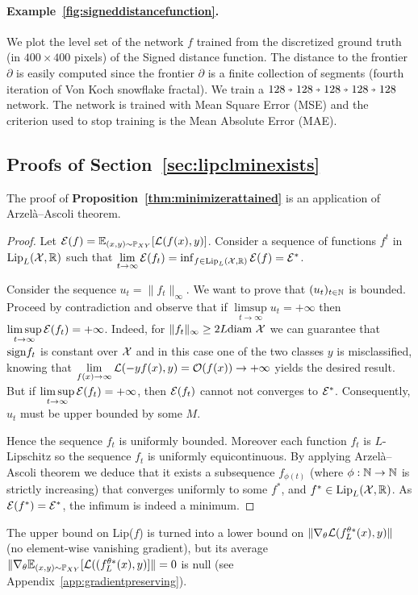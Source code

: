         \paragraph{Example~\ref{fig:signeddistancefunction}.} We plot the level set of the network $f$ trained from the discretized ground truth (in $400\times 400$ pixels) of the Signed distance function. The distance to the frontier $\partial$ is easily computed since the frontier $\partial$ is a finite collection of segments (fourth iteration of Von Koch snowflake fractal). We train a $128\veryshortarrow 128\veryshortarrow 128\veryshortarrow 128\veryshortarrow 128$ \LipCl network. The network is trained with Mean Square Error (MSE) and the criterion used to stop training is the Mean Absolute Error (MAE).   
    
    \subsection{Proofs of Section~\ref{sec:lipclminexists}}
    
    \minimizerattained*
    
        The proof of \textbf{Proposition~\ref{thm:minimizerattained}} is an application of Arzelà–Ascoli theorem.\begin{proof}
        Let $\mathcal{E}(f)=\mathbb{E}_{(x,y)\sim\mathbb{P}_{XY}}[\mathcal{L}(f(x),y)]$. Consider a sequence of functions $f^t$ in $\text{Lip}_L(\mathcal{X},\mathbb{R})$ such that $\lim\limits_{t\rightarrow\infty}\mathcal{E}(f_t)=\inf_{f\in\text{Lip}_L(\mathcal{X},\mathbb{R})}\mathcal{E}(f)=\mathcal{E}^{*}$.   
          
        Consider the sequence $u_t=\|f_t\|_{\infty}$. We want to prove that $(u_t)_{t\in\mathbb{N}}$ is bounded. Proceed by contradiction and observe that if $\limsup\limits_{t\rightarrow\infty}u_t=+\infty$ then $\limsup\limits_{t\rightarrow\infty}\mathcal{E}(f_t)=+\infty$. Indeed, for $\|f_t\|_{\infty}\geq2L\text{diam }\mathcal{X}$ we can guarantee that $\text{sign}{f_t}$ is constant over $\mathcal{X}$ and in this case one of the two classes $y$ is misclassified, knowing that $\lim\limits_{f(x)\rightarrow\infty}\mathcal{L}(-yf(x),y)=\mathcal{O}(f(x))\rightarrow+\infty$ yields the desired result. But if $\limsup\limits_{t\rightarrow\infty}\mathcal{E}(f_t)=+\infty$, then $\mathcal{E}(f_t)$ cannot not converges to $\mathcal{E}^{*}$. Consequently, $u_t$ must be upper bounded by some $M$.  
          
        Hence the sequence $f_t$ is uniformly bounded. Moreover each function $f_t$ is \mbox{$L$-Lipschitz} so the sequence $f_t$ is uniformly equicontinuous. By applying Arzelà–Ascoli theorem we deduce that it exists a subsequence $f_{\phi(t)}$ (where $\phi:\mathbb{N}\rightarrow\mathbb{N}$ is strictly increasing) that converges uniformly to some $f^{*}$, and $f^{*}\in\text{Lip}_L(\mathcal{X},\mathbb{R})$. As $\mathcal{E}(f^{*})=\mathcal{E}^{*}$, the infimum is indeed a minimum.  
        \end{proof}  
        The upper bound on Lip($f$) is turned into a lower bound on $\|\nabla_{\theta}\mathcal{L}(f_L^{\theta*}(x),y)\|$ (no element-wise vanishing gradient), but its average $\|\nabla_{\theta}\mathbb{E}_{(x,y)\sim\mathbb{P}_{XY}}[\mathcal{L}((f_L^{\theta*}(x),y)]\|=0$ is null (see Appendix~\ref{app:gradientpreserving}).  
        
